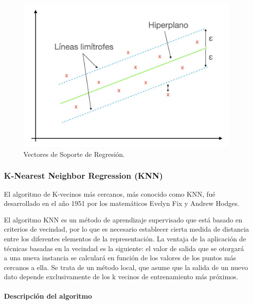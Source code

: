 \documentclass[12pt,a4paper,]{book}
\let\oldparagraph\paragraph
\renewcommand{\paragraph}[1]{\oldparagraph{#1}\mbox{}}
\numberwithin{dummy}{section}
\theoremstyle{ocrenumbox}
\theoremstyle{blacknumex}
\theoremstyle{blacknumbox}
\theoremstyle{ocrenum}
\theoremstyle{ocrenum}
\begin{document}
\begin{figure}[H]

{\centering \includegraphics[width=0.95\linewidth]{graficos/svr.jpg } 

}

\caption{Vectores de Soporte de Regresión.}\label{fig:SVR_lu}
\end{figure}

\hypertarget{k-nearest-neighbor-regression-knn}{%
\subsubsection{K-Nearest Neighbor Regression
(KNN)}\label{k-nearest-neighbor-regression-knn}}

El algoritmo de K-vecinos más cercanos, más conocido como KNN, fué
desarrollado en el año 1951 por los matemáticos Evelyn Fix y Andrew
Hodges.

El algoritmo KNN es un método de aprendizaje supervisado que está basado
en criterios de vecindad, por lo que es necesario establecer cierta
medida de distancia entre los diferentes elementos de la representación.
La ventaja de la aplicación de técnicas basadas en la vecindad es la
siguiente: el valor de salida que se otorgará a una nueva instancia se
calculará en función de los valores de los puntos más cercanos a ella.
Se trata de un método local, que asume que la salida de un nuevo dato
depende exclusivamente de los k vecinos de entrenamiento más próximos.

\hypertarget{descripciuxf3n-del-algoritmo-1}{%
\paragraph{Descripción del
algoritmo}\label{descripciuxf3n-del-algoritmo-1}}
\end{document}
